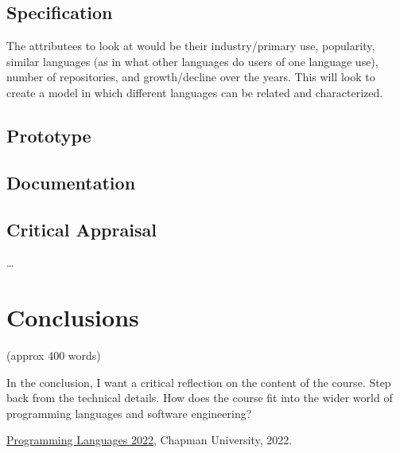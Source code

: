 \documentclass{article}
\theoremstyle{theorem}
\theoremstyle{definition}
\theoremstyle{remark}
\begin{document}
\subsection{Specification}
The attributees to look at would be their industry/primary use, popularity, similar languages (as in what other languages do users of one language use), number of repositories, and growth/decline over the years. This will look to create a model in which different languages can be related and characterized.
\subsection{Prototype}
\subsection{Documentation}
\subsection{Critical Appraisal}

\ldots

\section{Conclusions}\label{conclusions}

(approx 400 words)

In the conclusion, I want a critical reflection on the content of the course. Step back from the technical details. How does the course fit into the wider world of programming languages and software engineering?

\begin{thebibliography}{99}
 \href{https://github.com/alexhkurz/programming-languages-2022/blob/main/README.md}{Programming Languages 2022}, Chapman University, 2022.
\end{thebibliography}
\end{document}
